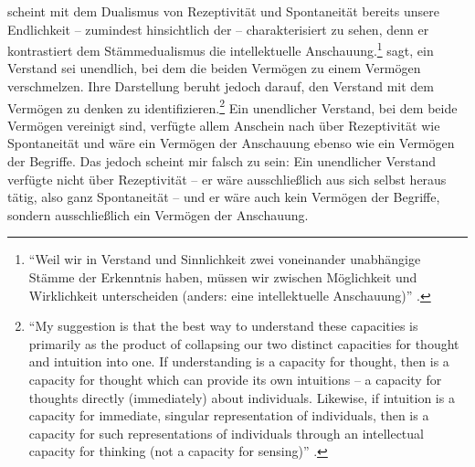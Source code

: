 scheint mit dem Dualismus
von Rezeptivität und Spontaneität bereits unsere Endlichkeit -- zumindest
hinsichtlich der  --
charakterisiert zu sehen, denn er kontrastiert dem
Stämmedualismus die intellektuelle Anschauung.\footnote{\enquote{Weil wir in
Verstand und Sinnlichkeit zwei voneinander unabhängige Stämme der Erkenntnis
haben, müssen wir zwischen Möglichkeit und Wirklichkeit unterscheiden (anders:
eine intellektuelle Anschauung)}
\parencite[][153]{Foerster:Die25JahrederPhilosophie2011}.}
 sagt, ein Verstand
sei unendlich, bei dem die beiden Vermögen zu einem Vermögen
verschmelzen. Ihre Darstellung beruht jedoch darauf, den Verstand mit dem
Vermögen zu denken zu identifizieren.\footnote{\enquote{My suggestion is that
the best way to understand these capacities is primarily as the product of collapsing our two
distinct capacities for thought and intuition into one. If understanding is a
capacity for thought, then  is a capacity for
thought which can provide its own intuitions -- a capacity for thoughts
directly (immediately) about individuals. Likewise, if intuition is a capacity
for immediate, singular representation of individuals, then  is a capacity for such representations of individuals through an
intellectual capacity for thinking (not a capacity for sensing)}
\parencite[][345]{Leech:MakingModalDistinctions2014}.}
Ein unendlicher Verstand, bei dem beide Vermögen vereinigt sind, verfügte allem
Anschein nach über Rezeptivität wie Spontaneität und wäre ein Vermögen der
Anschauung ebenso wie ein Vermögen der Begriffe. Das jedoch scheint mir falsch
zu sein: Ein unendlicher Verstand verfügte nicht über Rezeptivität -- er wäre
ausschließlich aus sich selbst heraus tätig, also ganz Spontaneität -- und er
wäre auch kein Vermögen der Begriffe, sondern ausschließlich ein Vermögen der
Anschauung.

